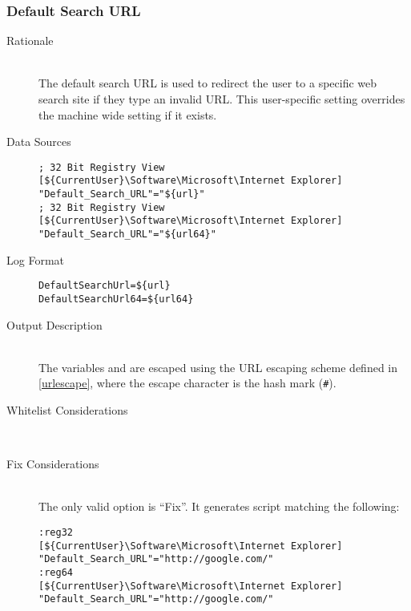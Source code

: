 \subsubsection{Default Search URL}
\begin{description}
\item[Rationale] \hfill \\
The default search URL is used to redirect the user to a specific web search
site if they type an invalid URL. This user-specific setting overrides the
machine wide setting if it exists.

\item[Data Sources] \hfill
\vspace{-\baselineskip}
\begin{verbatim}
; 32 Bit Registry View
[${CurrentUser}\Software\Microsoft\Internet Explorer]
"Default_Search_URL"="${url}"
; 32 Bit Registry View
[${CurrentUser}\Software\Microsoft\Internet Explorer]
"Default_Search_URL"="${url64}"
\end{verbatim}
\item[Log Format] \hfill
\vspace{-\baselineskip}
\begin{verbatim} 
DefaultSearchUrl=${url}
DefaultSearchUrl64=${url64}
\end{verbatim}
\item[Output Description] \hfill \\
The variables  and  are escaped using the URL escaping
scheme defined in \ref{urlescape}, where the escape character is the hash mark
(\verb|#|). 
\item[Whitelist Considerations] \hfill \\

\item[Fix Considerations] \hfill \\
The only valid option is ``Fix''. It generates script matching the following:
\vspace{-\baselineskip}
\begin{verbatim}
:reg32
[${CurrentUser}\Software\Microsoft\Internet Explorer]
"Default_Search_URL"="http://google.com/"
:reg64
[${CurrentUser}\Software\Microsoft\Internet Explorer]
"Default_Search_URL"="http://google.com/"
\end{verbatim}
\end{description}

